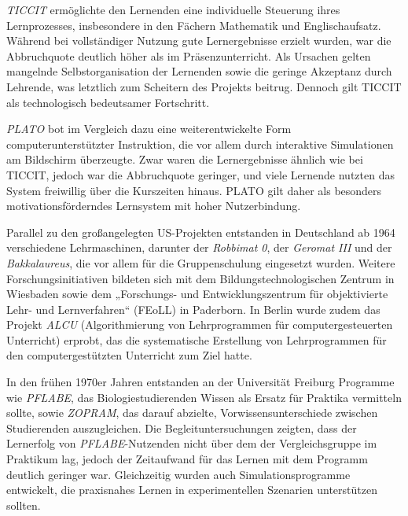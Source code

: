 \textit{TICCIT} ermöglichte den Lernenden eine individuelle Steuerung ihres Lernprozesses, insbesondere in den Fächern Mathematik und Englischaufsatz. Während bei vollständiger Nutzung gute Lernergebnisse erzielt wurden, war die Abbruchquote deutlich höher als im Präsenzunterricht. Als Ursachen gelten mangelnde Selbstorganisation der Lernenden sowie die geringe Akzeptanz durch Lehrende, was letztlich zum Scheitern des Projekts beitrug. Dennoch gilt TICCIT als technologisch bedeutsamer Fortschritt.\parencite[S.~71]{oshea_lernen_1986}\parencite[S.~13]{schonfeld_computerbasiertes_2006}

\textit{PLATO} bot im Vergleich dazu eine weiterentwickelte Form computerunterstützter Instruktion, die vor allem durch interaktive Simulationen am Bildschirm überzeugte. Zwar waren die Lernergebnisse ähnlich wie bei TICCIT, jedoch war die Abbruchquote geringer, und viele Lernende nutzten das System freiwillig über die Kurszeiten hinaus. PLATO gilt daher als besonders motivationsförderndes Lernsystem mit hoher Nutzerbindung.\parencite[S.~75f]{oshea_lernen_1986}\parencite[S.~14]{schonfeld_computerbasiertes_2006}

Parallel zu den großangelegten US-Projekten entstanden in Deutschland ab 1964 verschiedene Lehrmaschinen, darunter der \textit{Robbimat 0}, der \textit{Geromat III} und der \textit{Bakkalaureus}, die vor allem für die Gruppenschulung eingesetzt wurden. Weitere Forschungsinitiativen bildeten sich mit dem Bildungstechnologischen Zentrum in Wiesbaden sowie dem „Forschungs- und Entwicklungszentrum für objektivierte Lehr- und Lernverfahren“ (FEoLL) in Paderborn. In Berlin wurde zudem das Projekt \textit{ALCU} (Algorithmierung von Lehrprogrammen für computergesteuerten Unterricht) erprobt, das die systematische Erstellung von Lehrprogrammen für den computergestützten Unterricht zum Ziel hatte.\parencite[S.~10]{niegemann_kompendium_2008}\parencite[S.~11]{schonfeld_computerbasiertes_2006}

In den frühen 1970er Jahren entstanden an der Universität Freiburg Programme wie \textit{PFLABE}, das Biologiestudierenden Wissen als Ersatz für Praktika vermitteln sollte, sowie \textit{ZOPRAM}, das darauf abzielte, Vorwissensunterschiede zwischen Studierenden auszugleichen. Die Begleituntersuchungen zeigten, dass der Lernerfolg von \textit{PFLABE}-Nutzenden nicht über dem der Vergleichsgruppe im Praktikum lag, jedoch der Zeitaufwand für das Lernen mit dem Programm deutlich geringer war. Gleichzeitig wurden auch Simulationsprogramme entwickelt, die praxisnahes Lernen in experimentellen Szenarien unterstützen sollten.\parencite[S.~11]{niegemann_kompendium_2008}

